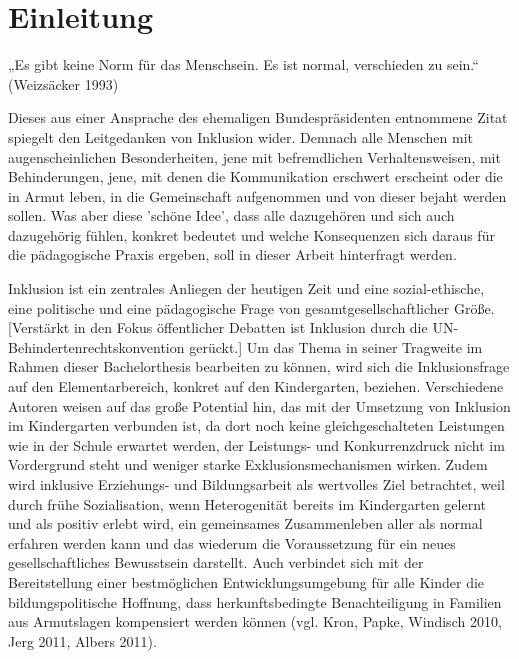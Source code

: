 \chapter{Einleitung}

„Es gibt keine Norm für das Menschsein. Es ist normal, verschieden zu sein.“ (Weizsäcker 1993) 

Dieses aus einer Ansprache des ehemaligen Bundespräsidenten entnommene Zitat spiegelt den Leitgedanken von Inklusion wider. Demnach alle Menschen mit augenscheinlichen Besonderheiten, jene mit befremdlichen Verhaltensweisen, mit Behinderungen, jene, mit denen die Kommunikation erschwert erscheint oder die in Armut leben, in die Gemeinschaft aufgenommen und von dieser bejaht werden sollen. 
Was aber diese 'schöne Idee', dass alle dazugehören und sich auch dazugehörig fühlen, konkret bedeutet und welche Konsequenzen sich daraus für die pädagogische Praxis ergeben, soll in dieser Arbeit hinterfragt werden.

Inklusion ist ein zentrales Anliegen der heutigen Zeit und eine sozial-ethische, eine politische und eine pädagogische Frage von gesamtgesellschaftlicher Größe. [Verstärkt in den Fokus öffentlicher Debatten ist Inklusion durch die UN-Behindertenrechtskonvention gerückt.]
Um das Thema in seiner Tragweite im Rahmen dieser Bachelorthesis bearbeiten zu können, wird 
sich die Inklusionsfrage auf den Elementarbereich, konkret auf den Kindergarten, beziehen. Verschiedene Autoren weisen auf das große Potential hin, das mit der Umsetzung von Inklusion im Kindergarten verbunden ist, da dort noch keine gleichgeschalteten Leistungen wie in der Schule erwartet werden, der Leistungs- und Konkurrenzdruck nicht im Vordergrund steht und weniger starke Exklusionsmechanismen wirken. Zudem wird inklusive Erziehungs- und Bildungsarbeit als wertvolles Ziel betrachtet, weil durch frühe Sozialisation, wenn Heterogenität bereits im Kindergarten gelernt und als positiv erlebt wird, ein gemeinsames Zusammenleben aller als normal erfahren werden kann und das wiederum die Voraussetzung für ein neues gesellschaftliches Bewusstsein darstellt. Auch verbindet sich mit der Bereitstellung einer bestmöglichen Entwicklungsumgebung für alle Kinder die bildungspolitische Hoffnung, dass herkunftsbedingte Benachteiligung in Familien aus Armutslagen kompensiert werden können (vgl. Kron, Papke, Windisch 2010, Jerg 2011, Albers 2011). 

